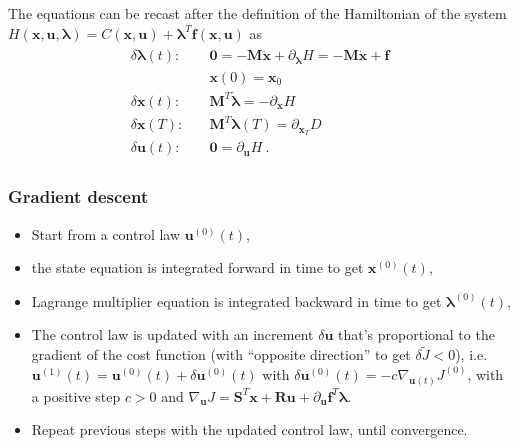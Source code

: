 \documentclass[letterpaper,10pt,english]{jupyterBook}
\begin{document}
\sphinxAtStartPar
The equations can be recast after the definition of the Hamiltonian of the system \(H(\mathbf{x},\mathbf{u},\boldsymbol\lambda) = C(\mathbf{x},\mathbf{u}) + \boldsymbol\lambda^T \mathbf{f}(\mathbf{x},\mathbf{u})\) as
\begin{equation}\label{equation:ch/control/optimal-control-full-state-general-ode:eq:optimal:ode:hamiltonian}
\begin{split}\begin{aligned}
 \delta \boldsymbol\lambda(t): & \quad \mathbf{0} = - \mathbf{M} \dot{\mathbf{x}} + \partial_{\boldsymbol\lambda} H = - \mathbf{M} \dot{\mathbf{x}} + \mathbf{f} \\
                               & \quad \mathbf{x}(0) = \mathbf{x}_0 \\
 \delta \mathbf{x}(t)        : & \quad \mathbf{M}^T \dot{\boldsymbol{\lambda}} = - \partial_{\mathbf{x}} H \\
 \delta \mathbf{x}(T)        : & \quad \mathbf{M}^T \boldsymbol\lambda(T) = \partial_{\mathbf{x}_T} D \\
 \delta \mathbf{u}(t)        : & \quad \mathbf{0} = \partial_\mathbf{u} H \ .
\end{aligned}\end{split}
\end{equation}\subsubsection*{Gradient descent}
\begin{itemize}
\item {} 
\sphinxAtStartPar
Start from a control law \(\mathbf{u}^{(0)}(t)\),

\item {} 
\sphinxAtStartPar
the state equation is integrated forward in time to get \(\mathbf{x}^{(0)}(t)\),

\item {} 
\sphinxAtStartPar
Lagrange multiplier equation is integrated backward in time to get \(\boldsymbol\lambda^{(0)}(t)\),

\item {} 
\sphinxAtStartPar
The control law is updated with an increment \(\delta \mathbf{u}\) that’s proportional to the gradient of the cost function (with “opposite direction” to get \(\delta \widetilde{J} < 0\)), i.e. \(\mathbf{u}^{(1)}(t) = \mathbf{u}^{(0)}(t) + \delta \mathbf{u}^{(0)}(t)\) with \(\delta \mathbf{u}^{(0)}(t) = - c \nabla_{\mathbf{u}(t)} J^{(0)}\), with a positive step \(c > 0\) and \(\nabla_{\mathbf{u}} J = \mathbf{S}^T \mathbf{x} + \mathbf{R} \mathbf{u} + \partial_{\mathbf{u}} \mathbf{f}^T \boldsymbol\lambda\).

\item {} 
\sphinxAtStartPar
Repeat previous steps with the updated control law, until convergence.

\end{itemize}
\end{document}
